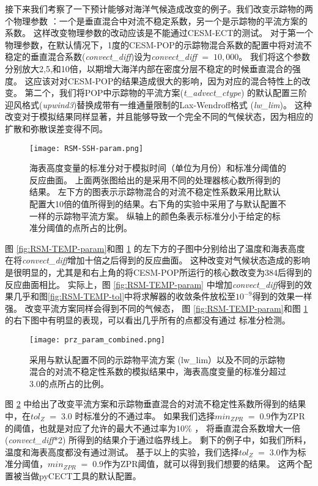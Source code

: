  
接下来我们考察了一下预计能够对海洋气候造成改变的例子。我们改变示踪物的两个物理参数 ：一个是垂直混合中对流不稳定系数，另一个是示踪物的平流方案的系数。
这样改变物理参数的改动应该是不能通过CESM-ECT的测试。
对于第一个物理参数，在默认情况下，1度的CESM-POP的示踪物混合系数的配置中将对流不稳定的垂直混合系数(\textit{convect\_diff})设为\textit{convect\_diff} $=\; 10,000$。
我们将这个参数分别放大2,5,和10倍，以期增大海洋内部在密度分层不稳定的时候垂直混合的强度。
这应该对对CESM-POP的结果造成很大的影响，因为对应的混合特性上的改变。
第二个，我们将POP中示踪物的平流方案(\textit{t\_advect\_ctype}) 的默认配置三阶迎风格式(\textit{upwind3})替换成带有一维通量限制的Lax-Wendroff格式 (\textit{lw\_lim})。
这种改变对于模拟结果同样显著，并且能够导致一个完全不同的气候状态，因为相应的扩散和弥散误差变得不同。

\begin{figure} 
\centering
\texttt{[image: RSM-SSH-param.png]}
\caption {
海表高度变量的标准分对于模拟时间（单位为月份）和标准分阈值的反应曲面。
上面两张图给出的是采用不同的处理器核心数所得到的结果。
左下方的图表示示踪物混合的对流不稳定性系数采用比默认配置大10倍的值所得到的结果。右下角的实验中采用了与默认配置不一样的示踪物平流方案。
纵轴上的颜色条表示标准分小于给定的标准分阈值的点所占的比例。}
\label{fig:RSM-SSH-param}
\end {figure}
 
图 \ref{fig:RSM-TEMP-param}和图 \ref{fig:RSM-SSH-param} 的左下方的子图中分别给出了温度和海表高度在将\textit{convect\_diff}增加十倍之后得到的反应曲面。 这种改变对气候状态造成的影响是很明显的，尤其是和右上角的将CESM-POP所运行的核心数改变为384后得到的反应曲面相比。
实际上，图  \ref{fig:RSM-TEMP-param} 中增加\textit{convect\_diff}得到的效果几乎和图\ref{fig:RSM-TEMP-tol}中将求解器的收敛条件放松至$10^{-9}$得到的效果一样强。
改变平流方案同样会得到不同的气候态， 图 \ref{fig:RSM-TEMP-param}和图 \ref{fig:RSM-SSH-param} 的右下图中有明显的表现，可以看出几乎所有的点都没有通过 标准分检测。 


\begin{figure} 
\centering
\texttt{[image: prz\_param\_combined.png]}
\caption{ 
  采用与默认配置不同的示踪物平流方案 (lw\_lim）以及不同的示踪物混合的对流不稳定性系数的模拟结果中，海表高度变量的标准分超过3.0的点所占的比例。}
\label {fig:PRZ-temp-param}
\end{figure}

   
图 \ref{fig:PRZ-temp-param} 中给出了改变平流方案和示踪物垂直混合的对流不稳定性系数所得到的结果中，在$tol_{Z} \; = \; 3.0$ 时标准分的不通过率。
如果我们选择$min_{ZPR} \; = \; 0.9$作为ZPR的阈值，也就是对应了允许的最大不通过率为10\% ， 将垂直混合系数增大一倍(\textit{convect\_diff}*2) 所得到的结果介于通过临界线上。
剩下的例子中，如我们所料，温度和海表高度都没有通过测试。 
基于以上的实验，我们选择$tol_{Z} \; = \; 3.0$作为标准分阈值，$min_{ZPR} \; = \; 0.9$作为ZPR阈值，就可以得到我们想要的结果。
这两个配置被当做pyCECT工具的默认配置。 



